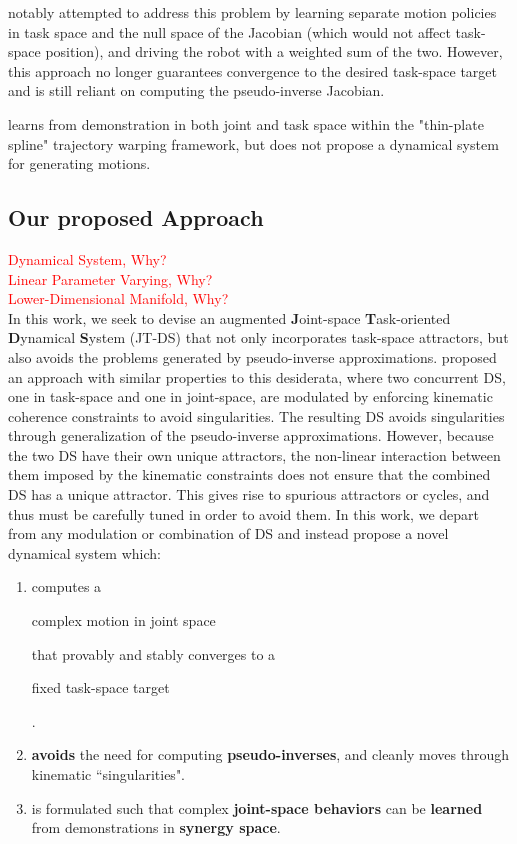 \documentclass[letterpaper, 10 pt, conference,fleqn]{ieeeconf}
\begin{document}
\cite{calinon2008probabilistic} notably attempted to address this problem by learning separate motion policies in task space and the null space of the Jacobian (which would not affect task-space position), and driving the robot with a weighted sum of the two. However, this approach no longer guarantees convergence to the desired task-space target and is still reliant on computing the pseudo-inverse Jacobian. 

\cite{lee2014unifying} learns from demonstration in both joint and task space within the "thin-plate spline" trajectory warping framework, but does not propose a dynamical system for generating motions.  


\subsection{Our proposed Approach}
\textcolor{red}{Dynamical System, Why?\\Linear Parameter Varying, Why?\\Lower-Dimensional Manifold, Why?\\}
In this work, we seek to devise an augmented \textbf{J}oint-space \textbf{T}ask-oriented \textbf{D}ynamical \textbf{S}ystem (JT-DS) that not only incorporates task-space attractors, but also avoids the problems generated by pseudo-inverse approximations. \cite{hersch2008reaching} proposed an approach with similar properties to this desiderata, where two concurrent DS, one in task-space and one in joint-space, are modulated by enforcing kinematic coherence constraints to avoid singularities. The resulting DS avoids singularities through generalization of the pseudo-inverse approximations. However, because the two DS have their own unique attractors, the non-linear interaction between them imposed by the kinematic constraints does not ensure that the combined DS has a unique attractor. This gives rise to spurious attractors or cycles, and thus must be carefully tuned in order to avoid them. In this work, we depart from any modulation or combination of DS and instead propose a novel dynamical system which:

\begin{enumerate}[leftmargin=*]
\item computes a \begin{bf}complex motion in joint space\end{bf} that provably and stably converges to a \begin{bf}fixed task-space target\end{bf}.
\item \textbf{avoids} the need for computing \textbf{pseudo-inverses}, and cleanly moves through kinematic ``singularities".
\item is formulated such that complex \textbf{joint-space behaviors} can be \textbf{learned} from demonstrations in \textbf{synergy space}.
\end{enumerate}
\end{document}
